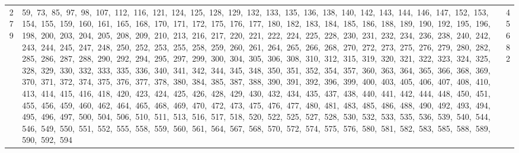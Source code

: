 \begin{longtable}{c|p{}|r}
279 & 59,\ 73,\ 85,\ 97,\ 98,\ 107,\ 112,\ 116,\ 121,\ 124,\ 125,\ 128,\ 129,\ 132,\ 133,\ 135,\ 136,\ 138,\ 140,\ 142,\ 143,\ 144,\ 146,\ 147,\ 152,\ 153,\ 154,\ 155,\ 159,\ 160,\ 161,\ 165,\ 168,\ 170,\ 171,\ 172,\ 175,\ 176,\ 177,\ 180,\ 182,\ 183,\ 184,\ 185,\ 186,\ 188,\ 189,\ 190,\ 192,\ 195,\ 196,\ 198,\ 200,\ 203,\ 204,\ 205,\ 208,\ 209,\ 210,\ 213,\ 216,\ 217,\ 220,\ 221,\ 222,\ 224,\ 225,\ 228,\ 230,\ 231,\ 232,\ 234,\ 236,\ 238,\ 240,\ 242,\ 243,\ 244,\ 245,\ 247,\ 248,\ 250,\ 252,\ 253,\ 255,\ 258,\ 259,\ 260,\ 261,\ 264,\ 265,\ 266,\ 268,\ 270,\ 272,\ 273,\ 275,\ 276,\ 279,\ 280,\ 282,\ 285,\ 286,\ 287,\ 288,\ 290,\ 292,\ 294,\ 295,\ 297,\ 299,\ 300,\ 304,\ 305,\ 306,\ 308,\ 310,\ 312,\ 315,\ 319,\ 320,\ 321,\ 322,\ 323,\ 324,\ 325,\ 328,\ 329,\ 330,\ 332,\ 333,\ 335,\ 336,\ 340,\ 341,\ 342,\ 344,\ 345,\ 348,\ 350,\ 351,\ 352,\ 354,\ 357,\ 360,\ 363,\ 364,\ 365,\ 366,\ 368,\ 369,\ 370,\ 371,\ 372,\ 374,\ 375,\ 376,\ 377,\ 378,\ 380,\ 384,\ 385,\ 387,\ 388,\ 390,\ 391,\ 392,\ 396,\ 399,\ 400,\ 403,\ 405,\ 406,\ 407,\ 408,\ 410,\ 413,\ 414,\ 415,\ 416,\ 418,\ 420,\ 423,\ 424,\ 425,\ 426,\ 428,\ 429,\ 430,\ 432,\ 434,\ 435,\ 437,\ 438,\ 440,\ 441,\ 442,\ 444,\ 448,\ 450,\ 451,\ 455,\ 456,\ 459,\ 460,\ 462,\ 464,\ 465,\ 468,\ 469,\ 470,\ 472,\ 473,\ 475,\ 476,\ 477,\ 480,\ 481,\ 483,\ 485,\ 486,\ 488,\ 490,\ 492,\ 493,\ 494,\ 495,\ 496,\ 497,\ 500,\ 504,\ 506,\ 510,\ 511,\ 513,\ 516,\ 517,\ 518,\ 520,\ 522,\ 525,\ 527,\ 528,\ 530,\ 532,\ 533,\ 535,\ 536,\ 539,\ 540,\ 544,\ 546,\ 549,\ 550,\ 551,\ 552,\ 555,\ 558,\ 559,\ 560,\ 561,\ 564,\ 567,\ 568,\ 570,\ 572,\ 574,\ 575,\ 576,\ 580,\ 581,\ 582,\ 583,\ 585,\ 588,\ 589,\ 590,\ 592,\ 594 & 45682 \\

\end{longtable}
